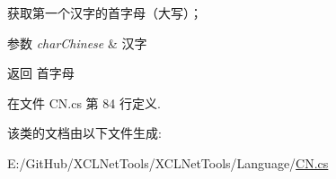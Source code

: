 获取第一个汉字的首字母（大写）； 


\begin{DoxyParams}{参数}
{\em char\+Chinese} & 汉字\\
\hline
\end{DoxyParams}
\begin{DoxyReturn}{返回}
首字母
\end{DoxyReturn}


在文件 C\+N.\+cs 第 84 行定义.



该类的文档由以下文件生成\+:\begin{DoxyCompactItemize}
\item 
E\+:/\+Git\+Hub/\+X\+C\+L\+Net\+Tools/\+X\+C\+L\+Net\+Tools/\+Language/\hyperlink{_c_n_8cs}{C\+N.\+cs}\end{DoxyCompactItemize}
